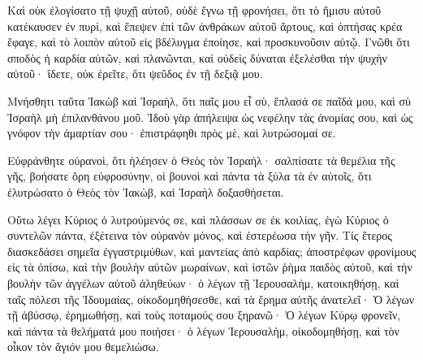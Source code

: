 {Καὶ οὐκ ἐλογίσατο τῇ ψυχῇ αὐτοῦ, οὐδὲ ἔγνω τῇ φρονήσει, ὅτι τὸ ἥμισυ αὐτοῦ κατέκαυσεν ἐν πυρὶ, καὶ ἔπεψεν ἐπὶ τῶν ἀνθράκων αὐτοῦ ἄρτους, καὶ ὀπτήσας κρέα ἔφαγε, καὶ τὸ λοιπὸν αὐτοῦ εἰς βδέλυγμα ἐποίησε, καὶ προσκυνοῦσιν αὐτῷ.
Γνῶθι ὅτι σποδὸς ἡ καρδία αὐτῶν, καὶ πλανῶνται, καὶ οὐδεὶς δύναται ἐξελέσθαι τὴν ψυχὴν αὐτοῦ· ἴδετε, οὐκ ἐρεῖτε, ὅτι ψεῦδος ἐν τῇ δεξιᾷ μου.
\par }{\PP {}Μνήσθητι ταῦτα Ἰακὼβ καὶ Ἰσραὴλ, ὅτι παῖς μου εἶ σὺ, ἔπλασά σε παῖδά μου, καὶ σὺ Ἰσραὴλ μὴ ἐπιλανθάνου μοῦ.
Ἰδοὺ γὰρ ἀπήλειψα ὡς νεφέλην τὰς ἀνομίας σου, καὶ ὡς γνόφον τὴν ἁμαρτίαν σου· ἐπιστράφηθι πρὸς μὲ, καὶ λυτρώσομαί σε.
\par }{\PP {}Εὐφράνθητε οὐρανοὶ, ὅτι ἠλέησεν ὁ Θεὸς τὸν Ἰσραήλ· σαλπίσατε τὰ θεμέλια τῆς γῆς, βοήσατε ὄρη εὐφροσύνην, οἱ βουνοὶ καὶ πάντα τὰ ξύλα τὰ ἐν αὐτοῖς, ὅτι ἐλυτρώσατο ὁ Θεὸς τὸν Ἰακὼβ, καὶ Ἰσραὴλ δοξασθήσεται.
\par }{\PP {}Οὕτω λέγει Κύριος ὁ λυτρούμενός σε, καὶ πλάσσων σε ἐκ κοιλίας, ἐγὼ Κύριος ὁ συντελῶν πάντα, ἐξέτεινα τὸν οὐρανὸν μόνος, καὶ ἐστερέωσα τὴν γῆν.
Τίς ἕτερος διασκεδάσει σημεῖα ἐγγαστριμύθων, καὶ μαντείας ἀπὸ καρδίας; ἀποστρέφων φρονίμους εἰς τὰ ὀπίσω, καὶ τὴν βουλὴν αὐτῶν μωραίνων,
καὶ ἱστῶν ῥὴμα παιδὸς αὐτοῦ, καὶ τὴν βουλὴν τῶν ἀγγέλων αὐτοῦ ἀληθεύων· ὁ λέγων τῇ Ἱερουσαλὴμ, κατοικηθήσῃ, καὶ ταῖς πόλεσι τῆς Ἰδουμαίας, οἰκοδομηθήσεσθε, καὶ τὰ ἔρημα αὐτῆς ἀνατελεῖ·
Ὁ λέγων τῇ ἀβύσσῳ, ἐρημωθήσῃ, καὶ τοὺς ποταμούς σου ξηρανῶ·
Ὁ λέγων Κύρῳ φρονεῖν, καὶ πάντα τὰ θελήματά μου ποιήσει· ὁ λέγων Ἱερουσαλὴμ, οἰκοδομηθήσῃ, καὶ τὸν οἶκον τὸν ἅγιόν μου θεμελιώσω.

}
